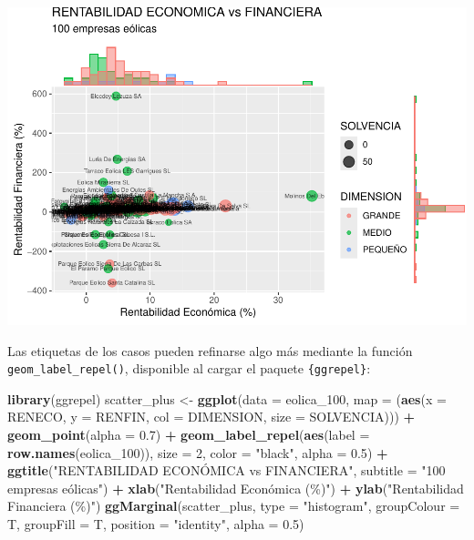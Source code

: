 \documentclass[
]{book}
\newenvironment{Shaded}{\begin{snugshade}}{\end{snugshade}}
\newcommand{\AttributeTok}[1]{\textcolor[rgb]{0.13,0.29,0.53}{#1}}
\newcommand{\DecValTok}[1]{\textcolor[rgb]{0.00,0.00,0.81}{#1}}
\newcommand{\FloatTok}[1]{\textcolor[rgb]{0.00,0.00,0.81}{#1}}
\newcommand{\FunctionTok}[1]{\textcolor[rgb]{0.13,0.29,0.53}{\textbf{#1}}}
\newcommand{\NormalTok}[1]{#1}
\newcommand{\OtherTok}[1]{\textcolor[rgb]{0.56,0.35,0.01}{#1}}
\newcommand{\SpecialCharTok}[1]{\textcolor[rgb]{0.81,0.36,0.00}{\textbf{#1}}}
\newcommand{\StringTok}[1]{\textcolor[rgb]{0.31,0.60,0.02}{#1}}
\let\Oldincludegraphics\includegraphics
\renewcommand{\includegraphics}[2][]{%
  \Oldincludegraphics[#1]{#2}%
}
\begin{document}
\includegraphics{_main_files/figure-latex/unnamed-chunk-123-1.pdf}

Las etiquetas de los casos pueden refinarse algo más mediante la función \texttt{geom\_label\_repel()}, disponible al cargar el paquete \texttt{\{ggrepel\}}:

\begin{Shaded}
\begin{Highlighting}[]
\FunctionTok{library}\NormalTok{(ggrepel)}
\NormalTok{scatter\_plus }\OtherTok{\textless{}{-}} \FunctionTok{ggplot}\NormalTok{(}\AttributeTok{data =}\NormalTok{ eolica\_100, }\AttributeTok{map =}\NormalTok{ (}\FunctionTok{aes}\NormalTok{(}\AttributeTok{x =}\NormalTok{ RENECO,}
                                                     \AttributeTok{y =}\NormalTok{ RENFIN,}
                                                     \AttributeTok{col =}\NormalTok{ DIMENSION,}
                                                     \AttributeTok{size =}\NormalTok{ SOLVENCIA))) }\SpecialCharTok{+}
  \FunctionTok{geom\_point}\NormalTok{(}\AttributeTok{alpha =} \FloatTok{0.7}\NormalTok{) }\SpecialCharTok{+}
  \FunctionTok{geom\_label\_repel}\NormalTok{(}\FunctionTok{aes}\NormalTok{(}\AttributeTok{label =} \FunctionTok{row.names}\NormalTok{(eolica\_100)),}
                   \AttributeTok{size =} \DecValTok{2}\NormalTok{,}
                   \AttributeTok{color =} \StringTok{"black"}\NormalTok{,}
                   \AttributeTok{alpha =} \FloatTok{0.5}\NormalTok{) }\SpecialCharTok{+}
  \FunctionTok{ggtitle}\NormalTok{(}\StringTok{"RENTABILIDAD ECONÓMICA vs FINANCIERA"}\NormalTok{,}
          \AttributeTok{subtitle =} \StringTok{"100 empresas eólicas"}\NormalTok{) }\SpecialCharTok{+}
  \FunctionTok{xlab}\NormalTok{(}\StringTok{"Rentabilidad Económica (\%)"}\NormalTok{) }\SpecialCharTok{+}
  \FunctionTok{ylab}\NormalTok{(}\StringTok{"Rentabilidad Financiera (\%)"}\NormalTok{)}
\FunctionTok{ggMarginal}\NormalTok{(scatter\_plus, }\AttributeTok{type =} \StringTok{"histogram"}\NormalTok{, }\AttributeTok{groupColour =}\NormalTok{ T,}
           \AttributeTok{groupFill =}\NormalTok{ T,}
           \AttributeTok{position =} \StringTok{"identity"}\NormalTok{, }\AttributeTok{alpha =} \FloatTok{0.5}\NormalTok{)}
\end{Highlighting}
\end{Shaded}
\end{document}
